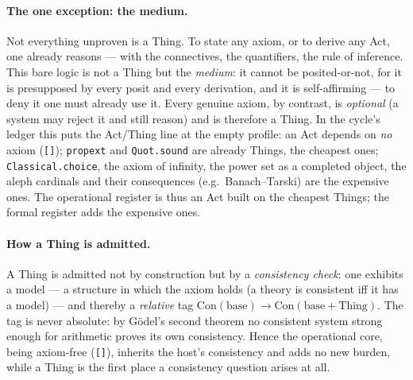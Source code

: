 \documentclass[11pt]{article}
\begin{document}
\paragraph{The one exception: the medium.}
Not everything unproven is a Thing. To state any axiom, or to derive any Act, one already reasons
--- with the connectives, the quantifiers, the rule of inference. This bare logic is not a Thing
but the \emph{medium}: it cannot be posited-or-not, for it is presupposed by every posit and every
derivation, and it is self-affirming --- to deny it one must already use it. Every genuine axiom,
by contrast, is \emph{optional} (a system may reject it and still reason) and is therefore a Thing.
In the cycle's ledger this puts the Act/Thing line at the empty profile: an Act depends on \emph{no}
axiom (\texttt{[]}); \texttt{propext} and \texttt{Quot.sound} are already Things, the cheapest ones;
\texttt{Classical.choice}, the axiom of infinity, the power set as a completed object, the aleph
cardinals and their consequences (e.g.\ Banach--Tarski) are the expensive ones. The operational
register is thus an Act built on the cheapest Things; the formal register adds the expensive ones.

\paragraph{How a Thing is admitted.}
A Thing is admitted not by construction but by a \emph{consistency check}: one exhibits a model ---
a structure in which the axiom holds (a theory is consistent iff it has a model) --- and thereby a
\emph{relative} tag $\mathrm{Con}(\text{base}) \to \mathrm{Con}(\text{base}+\text{Thing})$. The tag
is never absolute: by G\"odel's second theorem no consistent system strong enough for arithmetic
proves its own consistency. Hence the operational core, being axiom-free (\texttt{[]}), inherits the
host's consistency and adds no new burden, while a Thing is the first place a consistency question
arises at all.
\end{document}
